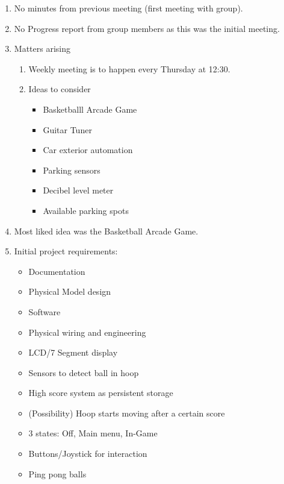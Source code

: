 \documentclass[11pt,a4paper]{article}
\begin{document}
\begin{enumerate}


\item No minutes from previous meeting (first meeting with group).

\item No Progress report from group members as this was the initial meeting.


\item Matters arising
   \begin{enumerate}
     \item Weekly meeting is to happen every Thursday at 12:30.
   \item Ideas to consider
      \begin{itemize}
        \item Basketballl Arcade Game
        \item Guitar Tuner
        \item Car exterior automation
        \item Parking sensors
        \item Decibel level meter
        \item Available parking spots
      \end{itemize}
   \end{enumerate}
  \item Most liked idea was the Basketball Arcade Game.
  \item Initial project requirements:
    \begin{itemize}
      \item Documentation
      \item Physical Model design
      \item Software
      \item Physical wiring and engineering
      \item LCD/7 Segment display
      \item Sensors to detect ball in hoop
      \item High score system as persistent storage
      \item (Possibility) Hoop starts moving after a certain score
      \item 3 states: Off, Main menu, In-Game
      \item Buttons/Joystick for interaction
      \item Ping pong balls
    \end{itemize}

\end{enumerate}
\end{document}
